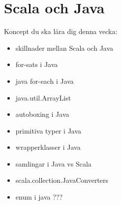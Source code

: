 \chapter{Scala och Java}\label{chapter:W11}
Koncept du ska lära dig denna vecka:
\begin{multicols}{2}\begin{itemize}[nosep,label={$\square$},leftmargin=*]
\item skillnader mellan Scala och Java
\item for-sats i Java
\item java for-each i Java
\item java.util.ArrayList
\item autoboxing i Java
\item primitiva typer i Java
\item wrapperklasser i Java
\item samlingar i Java vs Scala
\item scala.collection.JavaConverters
\item enum i java ???\end{itemize}\end{multicols}
